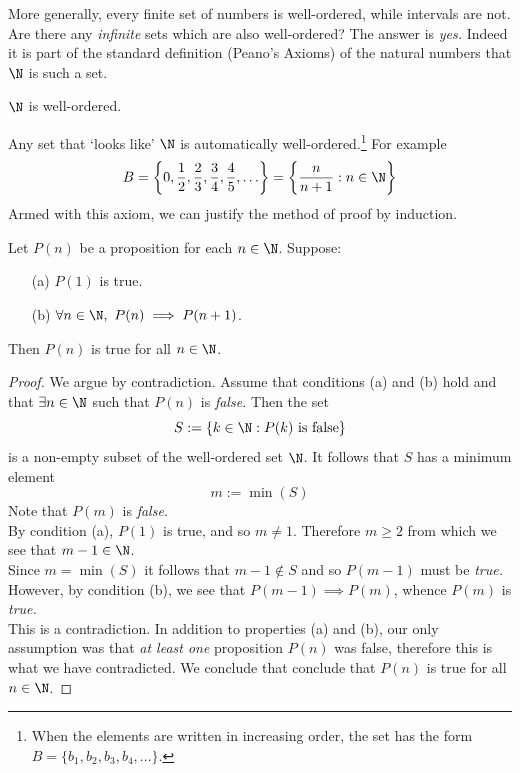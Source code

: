 \noindent More generally, every finite set of numbers is well-ordered, while intervals are not. Are there any \emph{infinite} sets which are also well-ordered? The answer is \emph{yes.} Indeed it is part of the standard definition (Peano's Axioms) of the natural numbers that $\N$ is such a set.

\begin{axiom}
$\N$ is well-ordered.
\end{axiom}

\noindent Any set that `looks like' $\N$ is automatically well-ordered.\footnote{When the elements are written in increasing order, the set has the form $B=\{b_1,b_2,b_3,b_4,\ldots\}$.} For example
\[B=\left\{0,\frac 12,\frac 23,\frac 34,\frac 45,\ldots\right\}=\left\{\frac n{n+1}:n\in\N\right\}\]
Armed with this axiom, we can justify the method of proof by induction. 

\begin{thm}\label{thm:ind}
Let $P(n)$ be a proposition for each $n\in\N$. Suppose:
\begin{enumerate}
  \item[(a)] $P(1)$ is true.
  \item[(b)] $\forall n\in\N,\ P(n)\implies P(n+1)$.
\end{enumerate}
Then $P(n)$ is true for all $n\in\N$.
\end{thm}

\begin{proof}
We argue by contradiction. Assume that conditions (a) and (b) hold and that $\exists n\in\N$ such that $P(n)$ is \emph{false.} Then the set
\[S:=\{k\in\N:P(k)\text{ is false}\}\]
is a non-empty subset of the well-ordered set $\N$. It follows that $S$ has a minimum element
\[m:=\min(S)\]
Note that $P(m)$ is \emph{false.}\\[2pt]
By condition (a), $P(1)$ is true, and so $m\neq 1$. Therefore $m\ge 2$ from which we see that $m-1\in\N$.\\[2pt]
Since $m=\min(S)$ it follows that $m-1\not\in S$ and so $P(m-1)$ must be \emph{true.}\\
However, by condition (b), we see that $P(m-1)\implies P(m)$, whence $P(m)$ is \emph{true.}\\[2pt]
This is a contradiction. In addition to properties (a) and (b), our only assumption was that \emph{at least one} proposition $P(n)$ was false, therefore this is what we have contradicted. We conclude that conclude that $P(n)$ is true for all $n\in\N$.
\end{proof}

